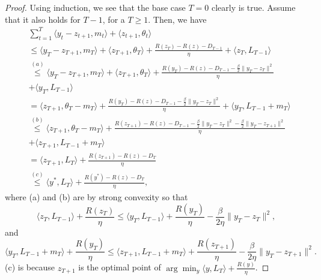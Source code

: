 \documentclass[final,12pt]{colt2018} %
\begin{document}
\begin{proof}
Using induction, we see that 
the base case $T=0$ clearly is true.
Assume that it also holds for $T-1$, for a $T \geq 1$.
Then, we have
\begin{equation}
\begin{aligned}
& \sum_{t=1}^{T}  \langle y_t - z_{t+1} , m_t \rangle + \langle z_{t+1} , \theta_t \rangle
\\& \leq \langle y_T - z_{T+1}, m_T \rangle + \langle z_{T+1}, \theta_T \rangle
+ \frac{ R(z_T) - R(z) - D_{T-1} }{\eta} + \langle z_{T}, L_{T-1} \rangle
\\& \overset{(a)}{\leq}
\langle y_T - z_{T+1}, m_T \rangle + \langle z_{T+1}, \theta_T \rangle
+ \frac{ R(y_T) - R(z) - D_{T-1} - \frac{\beta}{2} \| y_T - z_{T} \|^2 }{\eta} 
\\ & + \langle y_T, L_{T-1} \rangle
\\& = \langle z_{T+1}, \theta_T - m_T \rangle 
+ \frac{ R(y_T) - R(z) - D_{T-1} - \frac{\beta}{2} \| y_T - z_{T} \|^2 }{\eta} + \langle y_T, L_{T-1} + m_T \rangle
\\& \overset{(b)}{\leq}  \langle z_{T+1}, \theta_T - m_T \rangle 
+ \frac{ R(z_{T+1})- R(z) - D_{T-1} - \frac{\beta}{2} \| y_T - z_{T} \|^2 
- \frac{\beta}{2} \| y_T - z_{T+1} \|^2
}{\eta}
\\&  + \langle z_{T+1}, L_{T-1} + m_T \rangle
\\& = \langle z_{T+1}, L_T \rangle 
+ \frac{  R(z_{T+1})- R(z) - D_{T} }{\eta}
\\ & \overset{(c)}{\leq} 
\langle y^*, L_T \rangle 
+ \frac{  R(y^*) - R(z) - D_{T} }{\eta},
\end{aligned}
\end{equation}
where (a) and (b) are by strong convexity so that
\begin{equation}
\langle z_{T}, L_{T-1} \rangle + \frac{R(z_T)}{\eta}
\leq \langle y_{T}, L_{T-1} \rangle + \frac{R(y_T)}{\eta} - \frac{\beta}{2 \eta} \| y_T - z_T  \|^2,
\end{equation}
and
\begin{equation}
\langle y_{T}, L_{T-1} + m_T \rangle + \frac{R(y_T)}{\eta}
\leq \langle z_{T+1}, L_{T-1} + m_T \rangle + \frac{R(z_{T+1})}{\eta} - \frac{\beta}{2 \eta} \| y_T - z_{T+1}  \|^2.
\end{equation}
(c) is because $z_{T+1}$ is the optimal point of 
$\arg\min_y \langle y , L_T \rangle + \frac{R(y)}{\eta}$.


\end{proof}
\end{document}
